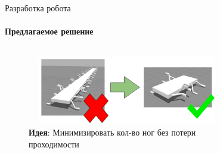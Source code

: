 \documentclass[aspectratio=169,xcolor=table]{beamer}
\begin{document}
\begin{frame}[t]{Разработка робота}
    \framesubtitle{Предлагаемое решение}
    \begin{columns}[T,onlytextwidth]
        \begin{column}{0.48\textwidth}
            \begin{figure}[H]
                \centering\includegraphics[height=3cm,width=1\textwidth,keepaspectratio]{optimization_idea.png}
                \caption*{\textbf{Идея}: Минимизировать кол-во ног без потери проходимости}
                \label{fig{optimization_idea.png}}
            \end{figure}
        \end{column}
        \begin{column}{0.50\textwidth}
            \vspace{-2cm}
            \begin{figure}[H]
                \centering
\end{figure}
\end{column}
\end{columns}
\end{frame}
\end{document}

